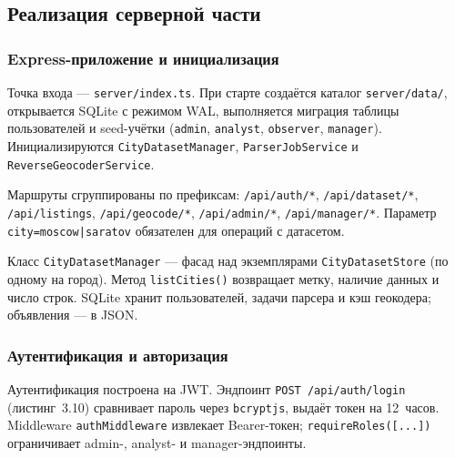 \subsection{Реализация серверной части}

\subsubsection{Express-приложение и инициализация}

Точка входа --- \texttt{server/index.ts}. При старте создаётся каталог \texttt{server/data/}, открывается SQLite с режимом WAL, выполняется миграция таблицы пользователей и seed-учётки (\texttt{admin}, \texttt{analyst}, \texttt{observer}, \texttt{manager}). Инициализируются \texttt{CityDatasetManager}, \texttt{ParserJobService} и \texttt{ReverseGeocoderService}.

Маршруты сгруппированы по префиксам: \texttt{/api/auth/*}, \texttt{/api/dataset/*}, \texttt{/api/listings}, \texttt{/api/geocode/*}, \texttt{/api/admin/*}, \texttt{/api/manager/*}. Параметр \texttt{city=moscow|saratov} обязателен для операций с датасетом.

Класс \texttt{CityDatasetManager} --- фасад над экземплярами \texttt{CityDatasetStore} (по одному на город). Метод \texttt{listCities()} возвращает метку, наличие данных и число строк. SQLite хранит пользователей, задачи парсера и кэш геокодера; объявления --- в JSON.

\subsubsection{Аутентификация и авторизация}

Аутентификация построена на JWT. Эндпоинт \texttt{POST /api/auth/login} (листинг~3.10) сравнивает пароль через \texttt{bcryptjs}, выдаёт токен на 12~часов. Middleware \texttt{authMiddleware} извлекает Bearer-токен; \texttt{requireRoles([...])} ограничивает admin-, analyst- и manager-эндпоинты.

